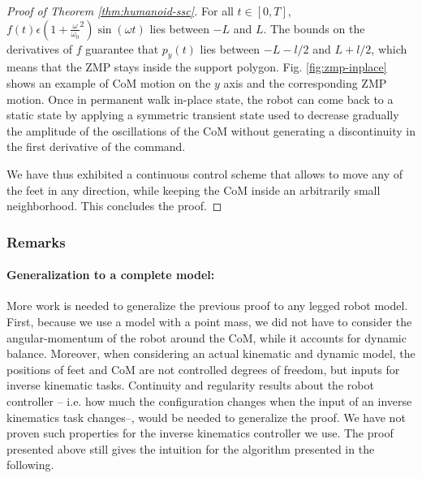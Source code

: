 \documentclass{article}
\begin{document}
\begin{proof}[Proof of Theorem \ref{thm:humanoid-ssc}]
For    all     $t    \in    [0,T]$,    $f(t)     \epsilon    (1    +
\frac{\omega}{\omega_0}^2)  \sin  (\omega t)$  lies  between $-L$  and
$L$. The bounds on the derivatives of $f$ guarantee that $p_y(t)$ lies
between  $-L- l/2$ and  $L+ l/2$,  which means  that the  ZMP stays
inside  the  support  polygon.  Fig.  \ref{fig:zmp-inplace}  shows  an
example  of CoM  motion  on the  $y$  axis and  the corresponding  ZMP
motion. Once in permanent walk in-place state, the robot can come back
to  a static  state by  applying a  symmetric transient  state  used to
decrease  gradually  the amplitude  of  the  oscillations  of the  CoM
without  generating a  discontinuity in  the first  derivative  of the
command.


We have thus exhibited a continuous control scheme that allows to move any of the feet
in any direction, while keeping the CoM inside an arbitrarily small neighborhood. This concludes
the proof.
\end{proof}


\subsubsection{Remarks}
\paragraph{Generalization to a complete model:} More work is needed to generalize 
the previous proof to any legged robot model. First, because we use a model with
a point mass, we did not have to consider the angular-momentum of the robot
around the CoM, while it accounts for dynamic balance. Moreover, when considering
an actual kinematic and dynamic model,
the positions of feet and CoM are not controlled degrees of freedom, but inputs 
for inverse kinematic tasks. Continuity and regularity results about the robot
controller -- i.e. how much the configuration changes when the input of an inverse
kinematics task changes--, would be needed to generalize the proof. We have not
proven such properties for the inverse kinematics controller we use. 
The  proof presented above still gives the intuition for the
algorithm presented in the following.
\end{document}
